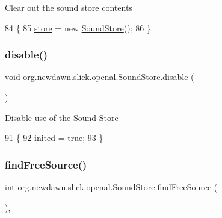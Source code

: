 Clear out the sound store contents 
\begin{DoxyCode}
84                         \{
85         \mbox{\hyperlink{classorg_1_1newdawn_1_1slick_1_1openal_1_1_sound_store_ac83a0d0311e4d9018f032c8774ea4120}{store}} = \textcolor{keyword}{new} \mbox{\hyperlink{classorg_1_1newdawn_1_1slick_1_1openal_1_1_sound_store_a2de0274f76fc1ffdc4e24827b164844d}{SoundStore}}();
86     \}
\end{DoxyCode}
\mbox{\label{classorg_1_1newdawn_1_1slick_1_1openal_1_1_sound_store_a089efb95bf3b186a6f9c8fdf28c40f13}} 
\subsubsection{\texorpdfstring{disable()}{disable()}}
{\footnotesize\ttfamily void org.\+newdawn.\+slick.\+openal.\+Sound\+Store.\+disable (\begin{DoxyParamCaption}{ }\end{DoxyParamCaption})\hspace{0.3cm}{\ttfamily [inline]}}

Disable use of the \mbox{\hyperlink{classorg_1_1newdawn_1_1slick_1_1_sound}{Sound}} Store 
\begin{DoxyCode}
91                           \{
92         \mbox{\hyperlink{classorg_1_1newdawn_1_1slick_1_1openal_1_1_sound_store_ad607db06655c505a0d3aa73eb16a06e1}{inited}} = \textcolor{keyword}{true};
93     \}
\end{DoxyCode}
\mbox{\label{classorg_1_1newdawn_1_1slick_1_1openal_1_1_sound_store_af12835b8519e39b5fcc1e51ab9dbed3c}} 
\subsubsection{\texorpdfstring{find\+Free\+Source()}{findFreeSource()}}
{\footnotesize\ttfamily int org.\+newdawn.\+slick.\+openal.\+Sound\+Store.\+find\+Free\+Source (\begin{DoxyParamCaption}{ }\end{DoxyParamCaption})\hspace{0.3cm}{\ttfamily [inline]}, {\ttfamily [private]}}

